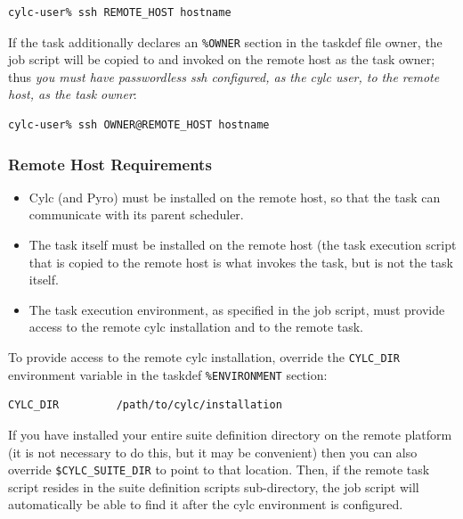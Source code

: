 \documentclass[11pt,a4paper]{article}
\begin{document}
\begin{lstlisting}
cylc-user% ssh REMOTE_HOST hostname
\end{lstlisting}

If the task additionally declares an \lstinline=%OWNER= section in the
taskdef file owner, the job script will be copied to and
invoked on the remote host as the task owner; thus {\em you must have
passwordless ssh configured, as the cylc user, to the remote host, as
the task owner}:

\begin{lstlisting}
cylc-user% ssh OWNER@REMOTE_HOST hostname
\end{lstlisting}


\subsubsection{Remote Host Requirements}

\begin{itemize}

    \item Cylc (and Pyro) must be installed on the remote host, so that 
        the task can communicate with its parent scheduler.
        
    \item The task itself must be installed on the remote host (the task
        execution script that is copied to the remote host is what
        invokes the task, but is not the task itself. 

    \item The task execution environment, as specified in the job
        script, must provide access to the remote cylc
        installation and to the remote task.

\end{itemize}

\lstset{language=cylctaskdef}

To provide access to the remote cylc installation, override the 
\lstinline=CYLC_DIR= environment variable in the taskdef
\lstinline=%ENVIRONMENT= section:

\begin{lstlisting}
CYLC_DIR         /path/to/cylc/installation
\end{lstlisting}

If you have installed your entire suite definition directory on the
remote platform (it is not necessary to do this, but it may be
convenient) then you can also override \lstinline=$CYLC_SUITE_DIR= to
point to that location. Then, if the remote task script resides in the
suite definition scripts sub-directory, the job script will
automatically be able to find it after the cylc environment is
configured.
\end{document}
